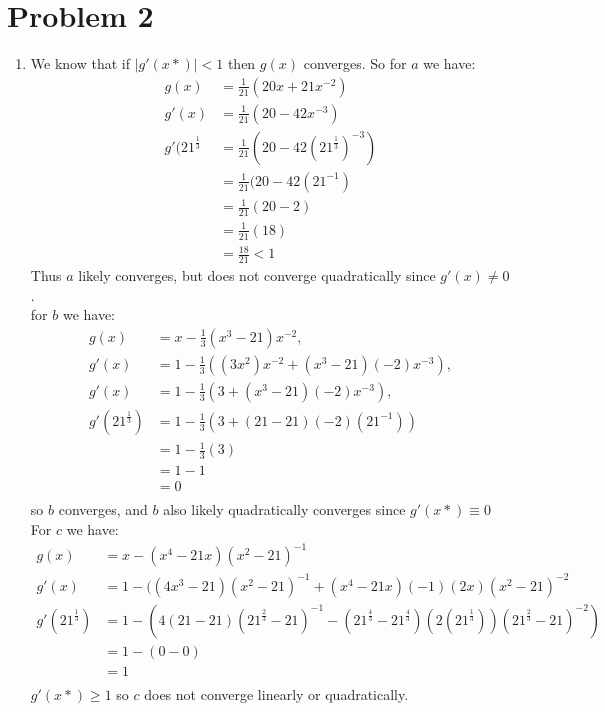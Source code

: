 \documentclass{article}
\begin{document}
\section*{Problem 2}
\begin{enumerate}
\item We know that if $|g'(x*)| < 1$ then $g(x)$ converges. So for $a$ we have:\\
\begin{align*}
g(x) &= \frac{1}{21}(20x + 21x^{-2})\\
g'(x) &= \frac{1}{21}(20 - 42x^{-3}) \\
g'(21^{\frac{1}{3}} &= \frac{1}{21}(20 - 42(21^{\frac{1}{3}})^{-3}) \\
&=  \frac{1}{21}(20 - 42(21^{-1}) \\
&= \frac{1}{21}(20 - 2) \\
&= \frac{1}{21}(18) \\
&= \frac{18}{21} < 1
\end{align*}
Thus $a$ likely converges, but does not converge quadratically since $g'(x) \neq 0$. \\
for $b$ we have: \\
\begin{align*}
g(x) &= x - \frac{1}{3}(x^3 - 21)x^{-2}, \\
g'(x) &= 1 - \frac{1}{3}((3x^2)x^{-2} + (x^3 - 21)(-2)x^{-3}), \\
g'(x) &= 1 - \frac{1}{3}(3 + (x^3 - 21)(-2)x^{-3}), \\
g'(21^{\frac{1}{3}}) &= 1 - \frac{1}{3}(3 + (21 - 21)(-2)(21^{-1})) \\
&= 1 - \frac{1}{3}(3) \\
& = 1 - 1 \\
&= 0 \\
\end{align*}
so $b$ converges, and $b$ also likely quadratically converges since $g'(x*) \equiv 0$\\
For $c$ we have:\\
\begin{align*}
g(x) &= x - (x^4 - 21x)(x^2 - 21)^{-1} \\
g'(x) &= 1 - ((4x^3 - 21)(x^2 - 21)^{-1} + (x^4 - 21x)(-1)(2x)(x^2 - 21)^{-2} \\
g'(21^{\frac{1}{3}})&= 1 - (4(21 - 21)(21^{\frac{2}{3}} - 21)^{-1} - (21^{\frac{4}{3}} - 21^{\frac{4}{3}})(2(21^{\frac{1}{3}}))(21^{\frac{2}{3}} - 21)^{-2}) \\
&= 1 - (0 - 0) \\
&= 1 \\
\end{align*}
$g'(x*) \geq 1$ so $c$ does not converge linearly or quadratically. 
\end{enumerate}
\end{document}
